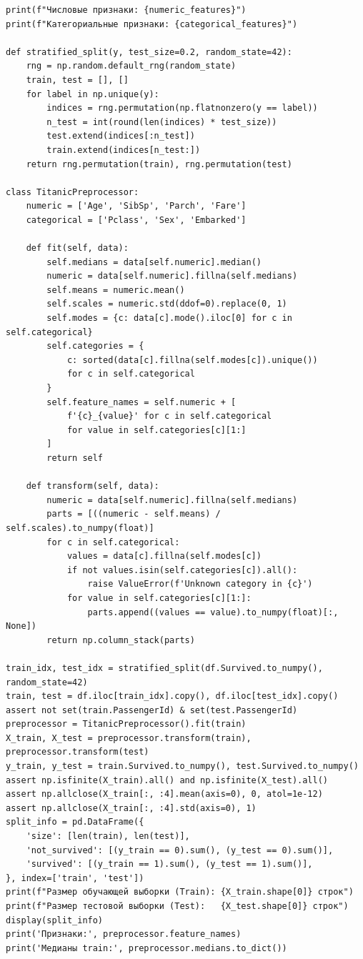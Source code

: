 \documentclass[a4paper,12pt]{article}
\begin{document}
\begin{verbatim}
print(f"Числовые признаки: {numeric_features}")
print(f"Категориальные признаки: {categorical_features}")

def stratified_split(y, test_size=0.2, random_state=42):
    rng = np.random.default_rng(random_state)
    train, test = [], []
    for label in np.unique(y):
        indices = rng.permutation(np.flatnonzero(y == label))
        n_test = int(round(len(indices) * test_size))
        test.extend(indices[:n_test])
        train.extend(indices[n_test:])
    return rng.permutation(train), rng.permutation(test)

class TitanicPreprocessor:
    numeric = ['Age', 'SibSp', 'Parch', 'Fare']
    categorical = ['Pclass', 'Sex', 'Embarked']

    def fit(self, data):
        self.medians = data[self.numeric].median()
        numeric = data[self.numeric].fillna(self.medians)
        self.means = numeric.mean()
        self.scales = numeric.std(ddof=0).replace(0, 1)
        self.modes = {c: data[c].mode().iloc[0] for c in self.categorical}
        self.categories = {
            c: sorted(data[c].fillna(self.modes[c]).unique())
            for c in self.categorical
        }
        self.feature_names = self.numeric + [
            f'{c}_{value}' for c in self.categorical
            for value in self.categories[c][1:]
        ]
        return self

    def transform(self, data):
        numeric = data[self.numeric].fillna(self.medians)
        parts = [((numeric - self.means) / self.scales).to_numpy(float)]
        for c in self.categorical:
            values = data[c].fillna(self.modes[c])
            if not values.isin(self.categories[c]).all():
                raise ValueError(f'Unknown category in {c}')
            for value in self.categories[c][1:]:
                parts.append((values == value).to_numpy(float)[:, None])
        return np.column_stack(parts)

train_idx, test_idx = stratified_split(df.Survived.to_numpy(), random_state=42)
train, test = df.iloc[train_idx].copy(), df.iloc[test_idx].copy()
assert not set(train.PassengerId) & set(test.PassengerId)
preprocessor = TitanicPreprocessor().fit(train)
X_train, X_test = preprocessor.transform(train), preprocessor.transform(test)
y_train, y_test = train.Survived.to_numpy(), test.Survived.to_numpy()
assert np.isfinite(X_train).all() and np.isfinite(X_test).all()
assert np.allclose(X_train[:, :4].mean(axis=0), 0, atol=1e-12)
assert np.allclose(X_train[:, :4].std(axis=0), 1)
split_info = pd.DataFrame({
    'size': [len(train), len(test)],
    'not_survived': [(y_train == 0).sum(), (y_test == 0).sum()],
    'survived': [(y_train == 1).sum(), (y_test == 1).sum()],
}, index=['train', 'test'])
print(f"Размер обучающей выборки (Train): {X_train.shape[0]} строк")
print(f"Размер тестовой выборки (Test):   {X_test.shape[0]} строк")
display(split_info)
print('Признаки:', preprocessor.feature_names)
print('Медианы train:', preprocessor.medians.to_dict())


\end{verbatim}
\end{document}
